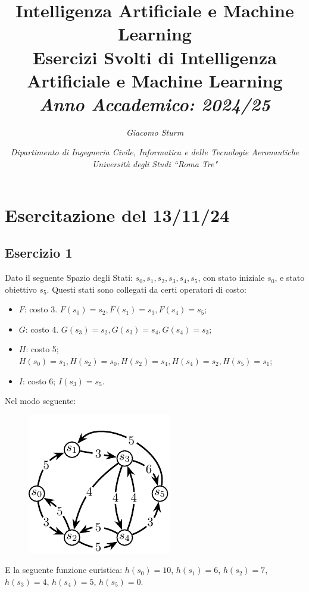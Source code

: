 \documentclass{article}
\numberwithin{equation}{section}
\begin{document}
\title{%
    \textbf{Intelligenza Artificiale e Machine Learning}  \\ 
    \large Esercizi Svolti di Intelligenza Artificiale e Machine Learning \\
    \textit{Anno Accademico: 2024/25}}
\author{\textit{Giacomo Sturm}}
\date{\textit{Dipartimento di Ingegneria Civile, Informatica e delle Tecnologie Aeronautiche \\
Università degli Studi ``Roma Tre"}}

\maketitle
\thispagestyle{link}

\clearpage


\pagestyle{fancy}
\fancyhead{}\fancyfoot{}
\fancyfoot[C]{\thepage}

\tableofcontents

\clearpage
{}

\section{Esercitazione del 13/11/24}

\subsection*{Esercizio 1}

Dato il seguente Spazio degli Stati: $s_0,s_1,s_2,s_3,s_4,s_5$, con stato iniziale $s_0$, e stato obiettivo $s_5$. 
Questi stati sono collegati da certi operatori di costo:
\begin{itemize}
    \item $F$: costo 3. $F(s_0)=s_2, F(s_1)=s_3, F(s_4)=s_5$;
    \item $G$: costo 4. $G(s_3)=s_2, G(s_3)=s_4, G(s_4)=s_3$;
    \item $H$: costo 5; $H(s_0)=s_1, H(s_2)=s_0, H(s_2)=s_4, H(s_4)=s_2, H(s_5)=s_1$;
    \item $I$: costo 6; $I(s_3)=s_5$.
\end{itemize}
Nel modo seguente: 

\begin{figure}[H]%
    \centering%
    \includegraphics[scale=1.2]{grafo_esercitazione_1.pdf}%
\end{figure}
E la seguente funzione euristica: $h(s_0)=10$, $h(s_1)=6$, $h(s_2)=7$, $h(s_3)=4$, $h(s_4)=5$, $h(s_5)=0$. 
\end{document}
